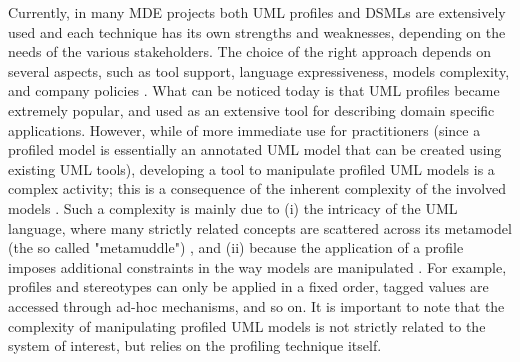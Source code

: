 Currently, in many MDE projects both UML profiles and DSMLs are extensively used and each technique has its own strengths and weaknesses, 
depending on the needs of the various stakeholders.
The choice of the right approach depends on several aspects, such as tool support, language expressiveness,
models complexity, and company policies \cite{comparison}.
What can be noticed today is that UML profiles became extremely popular, and used as an extensive tool for describing domain specific 
applications. 
However, while of more immediate use for practitioners (since a profiled model is essentially an annotated UML model that can be 
created using existing UML tools), developing a tool to manipulate profiled UML models is a complex activity; this is a consequence
of the inherent complexity of the involved models \cite{comparison}\cite{france}.
Such a complexity is mainly due to 
(i) the intricacy of the UML language, where many strictly related concepts are scattered across its metamodel (the so called "metamuddle"\cite{france})
, and (ii) because the application of a profile imposes additional constraints in the way models are manipulated \cite{UMLprofile}.
For example, profiles and stereotypes can only be applied in a fixed order, tagged values are accessed through ad-hoc mechanisms, and so on.
It is important to note that the complexity of manipulating profiled UML models is not strictly related to
the system of interest, but relies on the profiling technique itself.

